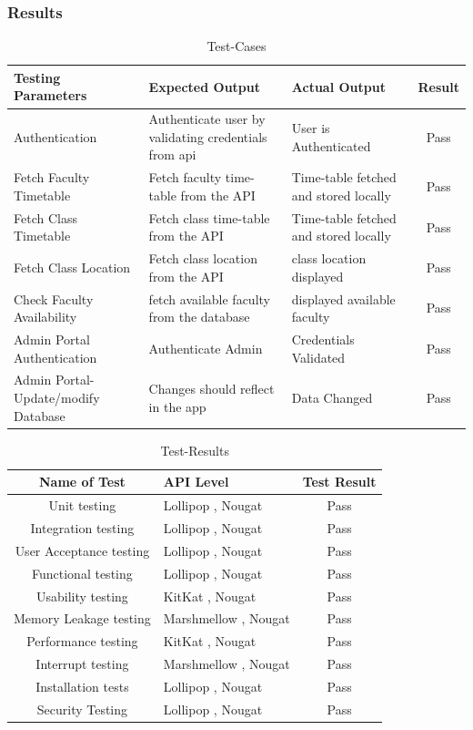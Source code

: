 \documentclass[BTech]{srmuthesis}
\begin{document}
\subsubsection{Results}
\begin{table}[htbp]
	\centering
\begin{tabular}{|L|L|L|c|}

	\hline
	Testing Parameters & Expected Output  & Actual Output &Result\\
	\hline
		\hline
	Authentication & Authenticate user by validating credentials from api & User is Authenticated &Pass\\
		\hline
	Fetch Faculty Timetable & Fetch faculty time-table from the API & Time-table fetched and stored locally &Pass\\
		\hline
	Fetch Class Timetable & Fetch class time-table from the API & Time-table fetched and stored locally &Pass\\
		\hline
	Fetch Class Location &  Fetch class location from the API & class location displayed & Pass\\
		\hline
	Check Faculty Availability & fetch available faculty from the database & displayed available faculty &Pass\\
		\hline
	Admin Portal Authentication & Authenticate Admin &Credentials Validated &Pass\\
		\hline
	Admin Portal-Update/modify Database   & Changes should reflect in the app & Data Changed &Pass\\
	\hline
\end{tabular}
\caption{Test-Cases}
\label{tab:test-cases}
  \end{table}
\begin{table}[htbp]
	\centering
\begin{tabular}{|c|L|c|}
	\hline
	Name of Test & API Level & Test Result\\
	\hline
		\hline
	Unit testing & Lollipop , Nougat & Pass\\
		\hline
	Integration testing & Lollipop , Nougat & Pass\\
		\hline
	User Acceptance testing & Lollipop , Nougat & Pass\\
		\hline
	Functional testing & Lollipop , Nougat & Pass\\
		\hline
	Usability testing & KitKat , Nougat & Pass \\
		\hline
	Memory Leakage testing & Marshmellow , Nougat & Pass\\
		\hline
	Performance testing   & KitKat , Nougat & Pass\\
		\hline
	Interrupt testing & Marshmellow , Nougat & Pass\\
		\hline
	Installation tests & Lollipop , Nougat & Pass\\
		\hline
	Security Testing & Lollipop , Nougat & Pass\\
	
	\hline
\end{tabular}
\caption{Test-Results}
\label{tab:test-results}
\end{table}
\end{document}
